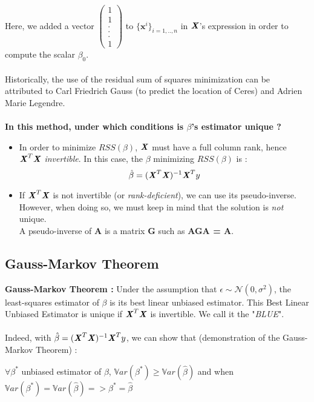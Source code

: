 \documentclass[a4paper,12pt]{article}
\newcommand{\xx}{{\bm x}}
\begin{document}
Here, we added a vector \(\left( \begin{array}{c}
1 \\
1 \\
.\\
. \\
. \\
1 \end{array} \right)\) to \({\{\xx^i\}}_{\textit{i}=1,..,\textit{n}}\) in  \(\textbf{\textit{X}}\)'s expression in order to compute the scalar \(\beta_0\). \\
\\
Historically, the use of the residual sum of squares minimization can be attributed to Carl Friedrich Gauss (to predict the location of Ceres) and Adrien Marie Legendre.
\\
\\
\textbf{In this method, under which conditions is \(\beta\)'s estimator unique ? }
\\

\begin{itemize}
\item
In order to minimize \(RSS(\beta)\), \(\textbf{\textit{X}}\) must have a full column rank, hence \(\textbf{\textit{X}}^T\textbf{\textit{X}}\) \textit{invertible}. In this case, the \(\beta\) minimizing \(RSS(\beta)\) is :
\[\hat{\beta} = (\textbf{\textit{X}}^T\textbf{\textit{X}})^{-1} \textbf{\textit{X}}^T y\]
\item
If \(\textbf{\textit{X}}^T\textbf{\textit{X}}\) is not invertible (or \textit{rank-deficient}), we can use its pseudo-inverse. However, when doing so, we must keep in mind that the solution is \textit{not} unique. \\ A pseudo-inverse of\textbf{ A} is a matrix \textbf{G} such as \textbf{AGA = A}.
\end{itemize}



\subsection{Gauss-Markov Theorem}

\textbf{Gauss-Markov Theorem :} Under the assumption that \(\epsilon\sim{}\mathcal{N}(0,{\sigma}^2)\), the least-squares estimator of \(\beta\) is its best linear unbiased estimator. This Best Linear Unbiased Estimator is unique if \(\textbf{\textit{X}}^T\textbf{\textit{X}}\) is invertible. We call it the "\textit{BLUE}".
\\
\\
Indeed, with \(\hat{\beta} = (\textbf{\textit{X}}^T\textbf{\textit{X}})^{-1} \textbf{\textit{X}}^T y\), we can show that (demonstration of the Gauss-Markov Theorem) :
\begin{center}
\(\forall \beta^*\) unbiased estimator of \(\beta\), \(\mathbb{V}ar(\beta^*) \geq \mathbb{V}ar(\hat{\beta})\) and when \(\mathbb{V}ar(\beta^*) = \mathbb{V}ar(\hat{\beta}) => \beta^* = \hat{\beta} \)
\end{center}
\vspace{1cm}
\end{document}
